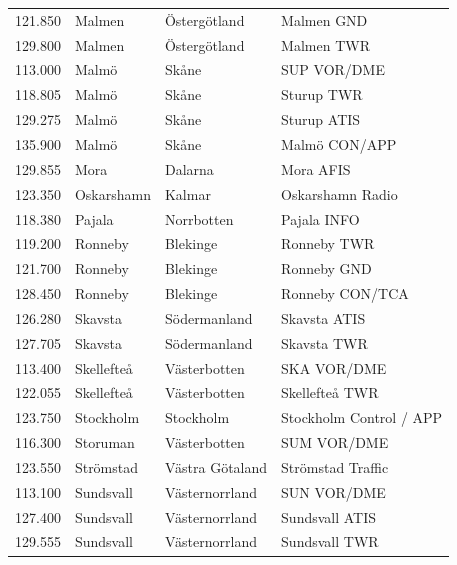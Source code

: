 \begin{longtable}{rlll}
  121.850 & Malmen       & Östergötland    & Malmen GND                      \\
  129.800 & Malmen       & Östergötland    & Malmen TWR                      \\
  113.000 & Malmö        & Skåne           & SUP VOR/DME                     \\
  118.805 & Malmö        & Skåne           & Sturup TWR                      \\
  129.275 & Malmö        & Skåne           & Sturup ATIS                     \\
  135.900 & Malmö        & Skåne           & Malmö CON/APP                   \\
  129.855 & Mora         & Dalarna         & Mora AFIS                       \\
  123.350 & Oskarshamn   & Kalmar          & Oskarshamn Radio                \\
  118.380 & Pajala       & Norrbotten      & Pajala INFO                     \\
  119.200 & Ronneby      & Blekinge        & Ronneby TWR                     \\
  121.700 & Ronneby      & Blekinge        & Ronneby GND                     \\
  128.450 & Ronneby      & Blekinge        & Ronneby CON/TCA                 \\
  126.280 & Skavsta      & Södermanland    & Skavsta ATIS                    \\
  127.705 & Skavsta      & Södermanland    & Skavsta TWR                     \\
  113.400 & Skellefteå   & Västerbotten    & SKA VOR/DME                     \\
  122.055 & Skellefteå   & Västerbotten    & Skellefteå TWR                  \\
  123.750 & Stockholm    & Stockholm       & Stockholm Control / APP         \\
  116.300 & Storuman     & Västerbotten    & SUM VOR/DME                     \\
  123.550 & Strömstad    & Västra Götaland & Strömstad Traffic               \\
  113.100 & Sundsvall    & Västernorrland  & SUN VOR/DME                     \\
  127.400 & Sundsvall    & Västernorrland  & Sundsvall ATIS                  \\
  129.555 & Sundsvall    & Västernorrland  & Sundsvall TWR                   \\

\end{longtable}
